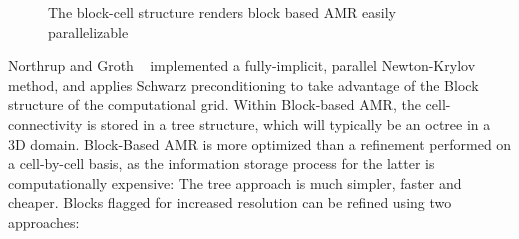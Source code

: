 %
\begin{figure}[t!]
\centering
\caption{The block-cell structure renders block based AMR easily parallelizable \cite{Northrup:2013}}  
\label{fig:moreAMR}
\end{figure}

Northrup and Groth ~\cite{Northrup:2005b} implemented a fully-implicit, parallel Newton-Krylov method, and applies Schwarz preconditioning to take advantage of the Block structure of the computational grid.
Within Block-based AMR, the cell-connectivity is stored in a tree structure, which will typically be an octree in a 3D domain. Block-Based AMR is more optimized than a refinement performed on a cell-by-cell basis, as the information storage process for the latter is computationally expensive: The tree approach is much simpler, faster and cheaper. Blocks flagged for increased resolution can be refined using two approaches: \par

